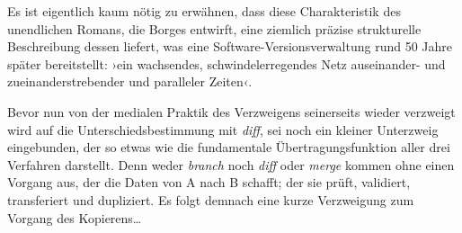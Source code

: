 \documentclass[a4paper,12pt]{article}
\newcommand{\anf}[1]{»#1«}
\newcommand{\inanf}[1]{›#1‹}
\begin{document}
Es ist eigentlich kaum nötig zu erwähnen, dass diese Charakteristik des unendlichen Romans, die Borges entwirft, eine ziemlich präzise strukturelle Beschreibung dessen liefert, was eine Software-Versionsverwaltung rund 50 Jahre später bereitstellt: \inanf{ein wachsendes, schwindelerregendes Netz auseinander- und zueinanderstrebender und paralleler Zeiten}.

Bevor nun von der medialen Praktik des Verzweigens seinerseits wieder verzweigt wird auf die Unterschiedsbestimmung mit \emph{diff}, sei noch ein kleiner Unterzweig eingebunden, der so etwas wie die fundamentale Übertragungsfunktion aller drei Verfahren darstellt. Denn weder \emph{branch} noch \emph{diff} oder \emph{merge} kommen ohne einen Vorgang aus, der die Daten von A nach B schafft; der sie prüft, validiert, transferiert und dupliziert. Es folgt demnach eine kurze Verzweigung zum Vorgang des Kopierens\ldots


\begin{comment}

 
Für die Coda:
 
Was liegt nun näher als diese abgründige Geschichte über die \anf{Verzweigung in der Zeit}\footcite[169]{borges:1941} als eine Art literarische Präfiguration der informatischen Versionskontrolle einzuordnen. Ja, sicher. 

Borges und die unterschiedlichen Zeitebenen, die in der Fiktion sich anbieten... Dies in Analogie zu unterschiedlichen Entwicklungszeiten bei der Softwareproduktion. 


Alternative Entwürfe sichern

Überblick bewahren. Version und Kontrolle. Diese Eigenschaften sind freilich auch bei der klassischen, das heisst philologischen Edition von Texten erforderlich. \anf{Ich habe Hunderte von Handschriften miteinander verglichen, habe die Fehler korrigiert, die sich durch die Nachlässigkeit der Abschreiber eingeschlichen haben; ich habe den Plan dieses Chaos erschossen, habe die ursprüngliche Ordnung wieder hergestellt}.\footcite[172]{borges:1941}

	***

Joethes Delegationen

Ein weiterer Aspekt
Verzweigen als Delegieren [Dies seinerseits als Abzweigung kennzeichnen...]
Goethes Verzweigungen: Seine lahme Tintenhand.

Sieben: 185–197.

Einbauen: 
"Alle Subalternen nehmen in spezifischer Weise eine Eigenart an, die sie ihrem Herrn und Gebieter ähnlicher werden läßt. Johann Georg Paul Götze, der rund 17 Jahre bei Goethen dient, gelingt es beispielsweise,...Der Meister dupliziert sich in seinen Domestiken."

	***


Siehe auch Schlagwort \inanf{Verzweigung} in Synapsen...

\end{comment}
\end{document}
